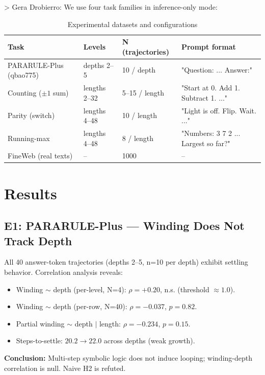 > Gera Drobierro:
We use four task families in inference-only mode:

\begin{table}[h]
\centering
\caption{Experimental datasets and configurations}
\begin{tabular}{llll}
\toprule
Task & Levels & N (trajectories) & Prompt format \\
\midrule
PARARULE-Plus (qbao775) & depths 2--5 & 10 / depth & "Question: ... Answer:" \\
Counting ($\pm1$ sum) & lengths 2--32 & 5--15 / length & "Start at 0. Add 1. Subtract 1. ..." \\
Parity (switch) & lengths 4--48 & 10 / length & "Light is off. Flip. Wait. ..." \\
Running-max & lengths 4--48 & 8 / length & "Numbers: 3 7 2 ... Largest so far?" \\
FineWeb (real texts) & -- & 1000 & -- \\
\bottomrule
\end{tabular}
\end{table}

\section{Results}

\subsection{E1: PARARULE-Plus — Winding Does Not Track Depth}

All 40 answer-token trajectories (depths 2--5, n=10 per depth) exhibit settling behavior. Correlation analysis reveals:

\begin{itemize}
    \item Winding $\sim$ depth (per-level, N=4): $\rho = +0.20$, n.s. (threshold $\approx 1.0$).
    \item Winding $\sim$ depth (per-row, N=40): $\rho = -0.037$, $p = 0.82$.
    \item Partial winding $\sim$ depth $|$ length: $\rho = -0.234$, $p = 0.15$.
    \item Steps-to-settle: $20.2 \rightarrow 22.0$ across depths (weak growth).
\end{itemize}

\textbf{Conclusion:} Multi-step symbolic logic does not induce looping; winding-depth correlation is null. Naive H2 is refuted.

